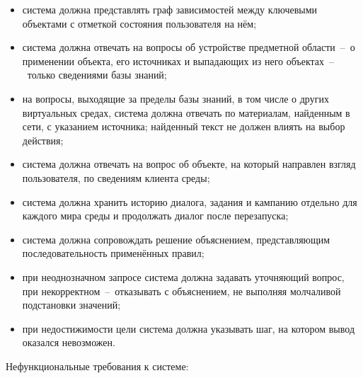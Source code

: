 \begin{itemize}
        инструменту и называть, что эта ступень открыла и что требуется для следующей;
  \item система должна представлять граф зависимостей между ключевыми объектами с
        отметкой состояния пользователя на нём;
  \item система должна отвечать на вопросы об устройстве предметной области~--~о
        применении объекта, его источниках и выпадающих из него объектах~--~только
        сведениями базы знаний;
  \item на вопросы, выходящие за пределы базы знаний, в том числе о других
        виртуальных средах, система должна отвечать по материалам, найденным в сети,
        с указанием источника; найденный текст не должен влиять на выбор действия;
  \item система должна отвечать на вопрос об объекте, на который направлен взгляд
        пользователя, по сведениям клиента среды;
  \item система должна хранить историю диалога, задания и кампанию отдельно для каждого
        мира среды и продолжать диалог после перезапуска;
  \item система должна сопровождать решение объяснением, представляющим
        последовательность применённых правил;
  \item при неоднозначном запросе система должна задавать уточняющий вопрос, при
        некорректном~--~отказывать с объяснением, не выполняя молчаливой подстановки
        значений;
  \item при недостижимости цели система должна указывать шаг, на котором вывод
        оказался невозможен.
\end{itemize}

Нефункциональные требования к системе:

